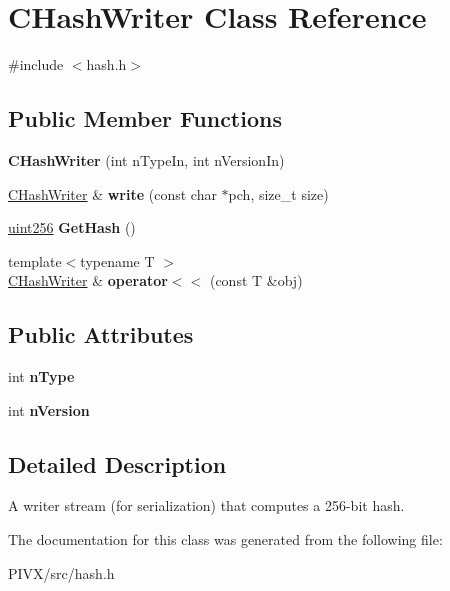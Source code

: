 \hypertarget{class_c_hash_writer}{}\section{C\+Hash\+Writer Class Reference}
\label{class_c_hash_writer}


{\ttfamily \#include $<$hash.\+h$>$}

\subsection*{Public Member Functions}
\begin{DoxyCompactItemize}
\item 
\mbox{\label{class_c_hash_writer_a81ce9a497a72fcb6b2612efdc20efbc9}} 
{\bfseries C\+Hash\+Writer} (int n\+Type\+In, int n\+Version\+In)
\item 
\mbox{\label{class_c_hash_writer_a779360281eeeb4cc7485c8acae649bc9}} 
\mbox{\hyperlink{class_c_hash_writer}{C\+Hash\+Writer}} \& {\bfseries write} (const char $\ast$pch, size\+\_\+t size)
\item 
\mbox{\label{class_c_hash_writer_ae94a937211502eabf19477630090093a}} 
\mbox{\hyperlink{classuint256}{uint256}} {\bfseries Get\+Hash} ()
\item 
\mbox{\label{class_c_hash_writer_a6551aed7315be5ba750680df18562f3a}} 
{\footnotesize template$<$typename T $>$ }\\\mbox{\hyperlink{class_c_hash_writer}{C\+Hash\+Writer}} \& {\bfseries operator$<$$<$} (const T \&obj)
\end{DoxyCompactItemize}
\subsection*{Public Attributes}
\begin{DoxyCompactItemize}
\item 
\mbox{\label{class_c_hash_writer_ae8fe02b05db26a2647a7aeee035f022f}} 
int {\bfseries n\+Type}
\item 
\mbox{\label{class_c_hash_writer_ad7d3642addab58385476dc0f9d55fa58}} 
int {\bfseries n\+Version}
\end{DoxyCompactItemize}


\subsection{Detailed Description}
A writer stream (for serialization) that computes a 256-\/bit hash. 

The documentation for this class was generated from the following file\+:\begin{DoxyCompactItemize}
\item 
P\+I\+V\+X/src/hash.\+h\end{DoxyCompactItemize}
